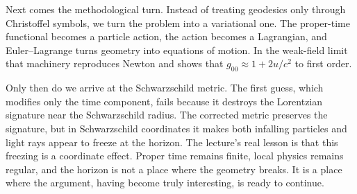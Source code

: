 Next comes the methodological turn. Instead of treating geodesics only through Christoffel symbols, we turn the problem into a variational one. The proper-time functional becomes a particle action, the action becomes a Lagrangian, and Euler--Lagrange turns geometry into equations of motion. In the weak-field limit that machinery reproduces Newton and shows that \(g_{00}\approx 1+2u/c^2\) to first order.

Only then do we arrive at the Schwarzschild metric. The first guess, which modifies only the time component, fails because it destroys the Lorentzian signature near the Schwarzschild radius. The corrected metric preserves the signature, but in Schwarzschild coordinates it makes both infalling particles and light rays appear to freeze at the horizon. The lecture's real lesson is that this freezing is a coordinate effect. Proper time remains finite, local physics remains regular, and the horizon is not a place where the geometry breaks. It is a place where the argument, having become truly interesting, is ready to continue.